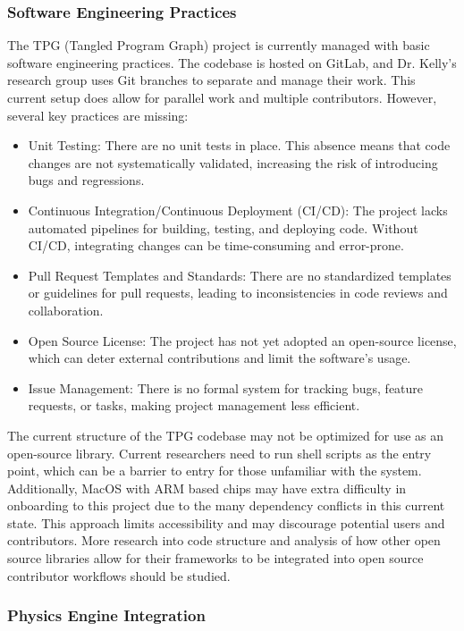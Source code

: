 \documentclass[12pt]{article}
\begin{document}
\subsubsection{Software Engineering Practices}
The TPG (Tangled Program Graph) project is currently managed with basic software engineering practices. The codebase is hosted on GitLab, and Dr. Kelly’s research group uses Git branches to separate and manage their work. This current setup does allow for parallel work and multiple contributors.
However, several key practices are missing:
\begin{itemize}
  \item Unit Testing: There are no unit tests in place. This absence means that code changes are not systematically validated, increasing the risk of introducing bugs and regressions.
  \item Continuous Integration/Continuous Deployment (CI/CD): The project lacks automated pipelines for building, testing, and deploying code. Without CI/CD, integrating changes can be time-consuming and error-prone.
  \item Pull Request Templates and Standards: There are no standardized templates or guidelines for pull requests, leading to inconsistencies in code reviews and collaboration.
  \item Open Source License: The project has not yet adopted an open-source license, which can deter external contributions and limit the software's usage.
  \item Issue Management: There is no formal system for tracking bugs, feature requests, or tasks, making project management less efficient. 
\end{itemize}
The current structure of the TPG codebase may not be optimized for use as an open-source library. Current researchers need to run shell scripts as the entry point, which can be a barrier to entry for those unfamiliar with the system. Additionally, MacOS with ARM based chips may have extra difficulty in onboarding to this project due to the many dependency conflicts in this current state. This approach limits accessibility and may discourage potential users and contributors. More research into code structure and analysis of how other open source libraries allow for their frameworks to be integrated into open source contributor workflows should be studied.

\subsubsection{Physics Engine Integration}
\end{document}
